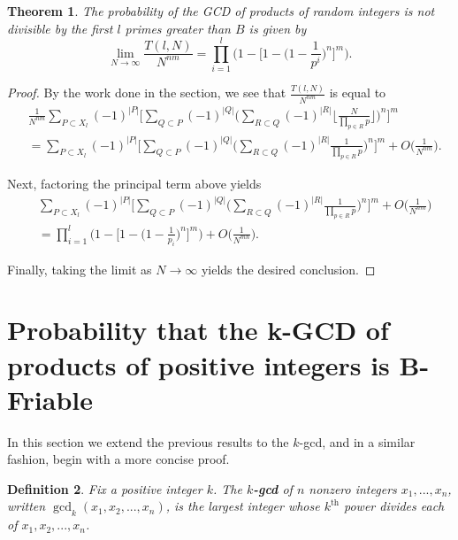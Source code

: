 \documentclass[12pt]{amsart}
\newtheorem{theorem}{Theorem}[subsection]
\newtheorem{definition}[theorem]{Definition}
\theoremstyle{definition}
\begin{document}
\begin{theorem} The probability of the GCD of products of random integers is not divisible by the first $l$ primes greater than $B$ is given by 
	$$\lim_{N\to\infty} \frac{T(l,N)}{N^{nm}} = \prod_{i=1}^{l} \Big(1 - \Big[1 - \Big(1-\frac{1}{p^i}\Big)^n\Big]^m\Big).$$
\end{theorem}

\begin{proof}
	By the work done in the section, we see that $\displaystyle \frac{T(l,N)}{N^{nm}}$ is equal to 
	\begin{align*}
		&\frac{1}{N^{nm}}\sum_{P\subset X_l}{(-1)^{|P|}}\Big[\sum_{Q\subset P}(-1)^{|Q|}\Big(\sum_{R\subset Q}(-1)^{|R|}\Big\lfloor\frac{N}{\prod_{p\in R} p} \Big\rfloor\Big)^n\Big]^m\\
		&= \sum_{P\subset X_l}{(-1)^{|P|}} \Big[\sum_{Q\subset P}(-1)^{|Q|} \Big(\sum_{R\subset Q}(-1)^{|R|} \frac{1}{\prod_{p\in R} p}\Big)^n\Big]^m+O\Big(\frac{1}{N^{nm}}\Big).
	\end{align*}
	
	\noindent Next, factoring the principal term above yields
	\begin{align*}
		&\sum_{P\subset X_l}{(-1)^{|P|}} \Big[\sum_{Q\subset P}(-1)^{|Q|} \Big(\sum_{R\subset Q}(-1)^{|R|}\frac{1}{\prod_{p\in R} p}\Big)^n \Big]^m + O\Big(\frac{1}{N^{nm}}\Big)\\ &= \prod_{i=1}^{l} \Big(1 - \Big[1 - \Big(1 - \frac{1}{p_i}\Big)^n\Big]^m \Big) + O\Big(\frac{1}{N^{mn}}\Big). 
	\end{align*}
	
	\noindent Finally, taking the limit as $N \to \infty$ yields the desired conclusion.
\end{proof}

\section{Probability that the k-GCD of products of positive integers is  B-Friable}
In this section we extend the previous results to the $k$-gcd, and in a similar fashion, begin with a more concise proof.

\begin{definition} Fix a positive integer $k$. The \textbf{$k$-gcd} of $n$ nonzero integers $x_1, ..., x_n$, written $\gcd_k(x_1,x_2, ...,x_n)$, is the largest integer whose $k^{\text{th}}$ power divides each of $x_1, x_2, ..., x_n$.
\end{definition}	
\end{document}
